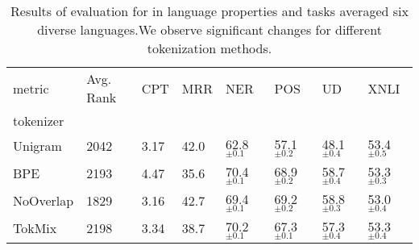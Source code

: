 \begin{table}
\centering
\caption{Results of evaluation for in language properties and tasks averaged six diverse languages.We observe significant changes for different tokenization methods.}
\label{tab:in_lang_avg}
\small
\begin{tabular}{llllllll}
\toprule
metric & Avg. Rank &   CPT &   MRR &               NER &               POS &                UD &              XNLI \\
tokenizer &           &       &       &                   &                   &                   &                   \\
\midrule
Unigram   &      2042 &  3.17 &  42.0 &  62.8 $_{\pm0.1}$ &  57.1 $_{\pm0.2}$ &  48.1 $_{\pm0.4}$ &  53.4 $_{\pm0.5}$ \\
BPE       &      2193 &  4.47 &  35.6 &  70.4 $_{\pm0.1}$ &  68.9 $_{\pm0.2}$ &  58.7 $_{\pm0.4}$ &  53.3 $_{\pm0.3}$ \\
NoOverlap &      1829 &  3.16 &  42.7 &  69.4 $_{\pm0.1}$ &  69.2 $_{\pm0.2}$ &  58.8 $_{\pm0.3}$ &  53.0 $_{\pm0.4}$ \\
TokMix    &      2198 &  3.34 &  38.7 &  70.2 $_{\pm0.1}$ &  67.3 $_{\pm0.1}$ &  57.3 $_{\pm0.4}$ &  53.3 $_{\pm0.4}$ \\
\bottomrule
\end{tabular}
\end{table}
